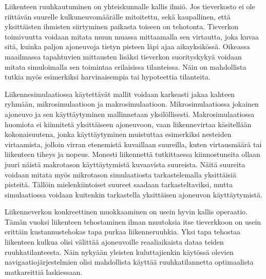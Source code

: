 \documentclass[english, 12pt, a4paper, elec, utf8, pdfa, online]{aaltothesis}
\date{\pubdate}
\begin{document}
\makecoverpage
\makecopyrightpage

\begin{abstractpage}[english]
	\abstracttext{}
\end{abstractpage}

\newpage


\begin{abstractpage}[finnish]
    {\footnotesize
    Liikenteen ruuhkautuminen on yhteiskunnalle kallis ilmiö. Jos tieverkosto ei ole riittävän suurelle kulkuneuvomäärälle mitoitettu, sekä kaupallinen, että yksittäisten ihmisten siirtyminen paikasta toiseen on tehotonta. Tieverkon toimivuutta voidaan mitata muun muassa mittaamalla sen virtautta, joka kuvaa sitä, kuinka paljon ajoneuvoja tietyn pisteen läpi ajaa aikayksikössä. Oikeassa maailmassa tapahtuvien mittausten lisäksi tieverkon suorityskykyä voidaan mitata simuloimalla sen toimintaa erilaisissa tilanteissa. Näin on mahdollista tutkia myös esimerkiksi harvinaisempia tai hypoteettia tilanteita.

    Liikennesimulaatiossa käytettävät mallit voidaan karkeasti jakaa kahteen ryhmään, mikrosimulaatioon ja makrosimulaatioon. Mikrosimulaatiossa jokainen ajoneuvo ja sen käyttäytyminen mallinnetaan yksilöllisesti. Makrosimulaatiossa huomiota ei kiinnitetä yksittäiseen ajoneuvoon, vaan liikennevirtaa käsitellään kokonaisuutena, jonka käyttäytyminen muistuttaa esimerkiksi nesteiden virtaamista, jolloin virran etenemistä kuvaillaan suureilla, kuten virtausmäärä tai liikenteen tiheys ja nopeus. Monesti liikennettä tutkittaessa kiinnostuneita ollaan juuri näistä makrotason käyttäytymistä kuvaavista suureista. Näitä suureita voidaan mitata myös mikrotason simulaatiosta tarkastelemalla yksittäisiä pisteitä. Tällöin mielenkiintoiset suureet saadaan tarkasteltaviksi, mutta simulaatiossa voidaan kuitenkin tarkastella yksittäisen ajoneuvon käyttäytymistä.

    Liikenneverkon konkreettinen muokkaaminen on usein hyvin kallis operaatio. Tämän vuoksi liikenteen tehostaminen ilman muutoksia itse tieverkkoon on usein erittäin kustannustehokas tapa purkaa liikenneruuhkia. Yksi tapa tehostaa liikenteen kulkua olisi välittää ajoneuvoille reaaliaikaista dataa teiden ruuhkatilanteesta. Näin nykyään yleisten kuluttajienkin käytössä olevien navigaatiojärjestelmien olisi mahdollista käyttää ruuhkatilannetta optimaalista matkareittiä laskiessaan.

}
\end{abstractpage}
\end{document}
